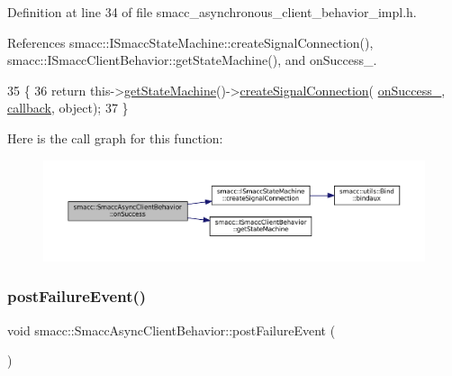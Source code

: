 Definition at line 34 of file smacc\+\_\+asynchronous\+\_\+client\+\_\+behavior\+\_\+impl.\+h.



References smacc\+::\+I\+Smacc\+State\+Machine\+::create\+Signal\+Connection(), smacc\+::\+I\+Smacc\+Client\+Behavior\+::get\+State\+Machine(), and on\+Success\+\_\+.


\begin{DoxyCode}
35     \{
36         \textcolor{keywordflow}{return} this->\hyperlink{classsmacc_1_1ISmaccClientBehavior_a9d55a85bf0a920033805a3c050de2019}{getStateMachine}()->\hyperlink{classsmacc_1_1ISmaccStateMachine_adf0f42ade0c65cc471960fe2a7c42da2}{createSignalConnection}(
      \hyperlink{classsmacc_1_1SmaccAsyncClientBehavior_a31d8bdfa46fe70aea9adf0958806462b}{onSuccess\_}, \hyperlink{sm__ridgeback__barrel__search__1_2servers_2opencv__perception__node_2opencv__perception__node_8cpp_a050e697bd654facce10ea3f6549669b3}{callback}, \textcolor{keywordtype}{object});
37     \}
\end{DoxyCode}
Here is the call graph for this function\+:
\nopagebreak
\begin{figure}[H]
\begin{center}
\leavevmode
\includegraphics[width=350pt]{classsmacc_1_1SmaccAsyncClientBehavior_a48d8a07e7fc65220f1eeee49af02a82a_cgraph}
\end{center}
\end{figure}
\mbox{\label{classsmacc_1_1SmaccAsyncClientBehavior_af6fa358cb1ab5ed16791a201f59260e0}} 
\subsubsection{\texorpdfstring{post\+Failure\+Event()}{postFailureEvent()}}
{\footnotesize\ttfamily void smacc\+::\+Smacc\+Async\+Client\+Behavior\+::post\+Failure\+Event (\begin{DoxyParamCaption}{ }\end{DoxyParamCaption})\hspace{0.3cm}{\ttfamily [protected]}}



